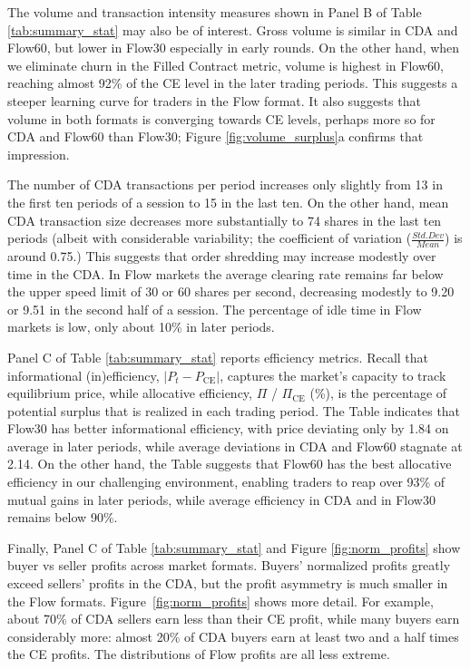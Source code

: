 \documentclass[12pt]{article}
\begin{document}
The volume and transaction intensity measures shown in Panel B of Table \ref{tab:summary_stat} may also be of interest.
Gross volume is similar in CDA and Flow60, but lower in Flow30
especially in early rounds.
On the other hand, when we eliminate churn in the Filled Contract metric, volume is highest in Flow60, reaching almost 92\% of the CE level in the later trading periods.  
This suggests a steeper learning curve for traders in the Flow format. 
It also suggests that volume in both formats is converging towards CE levels, perhaps more so for CDA and Flow60 than Flow30; 
Figure \ref{fig:volume_surplus}a
confirms that impression.


The number of CDA transactions per period increases only slightly from 13 in the first ten periods of a session to 15 in the last ten. On the other hand, mean CDA transaction size decreases more substantially to 74 shares in the last ten periods (albeit with considerable variability; the coefficient of variation ($\frac{Std. Dev}{Mean}$) is around 0.75.) 
This suggests that order shredding may increase modestly
over time in the CDA.
In Flow markets the average clearing rate remains far below the upper speed limit of 30 or 60 shares per second, decreasing modestly to 9.20 or 9.51 in the second half of a session. 
The percentage of idle time in Flow markets %
is low, only about 10\% in later periods. 

Panel C of Table \ref{tab:summary_stat} reports efficiency metrics. Recall that informational (in)efficiency, $\lvert P_t - P_{\text{CE}} \rvert $, captures the market's capacity to track equilibrium price, while allocative efficiency,  $\Pi$ / $\Pi_{\text{CE}}$ (\%), is the percentage of potential surplus that is realized in each trading period. The Table indicates that Flow30 has better informational efficiency, with price deviating only by 1.84 on average in later periods,
while average deviations in CDA and Flow60 stagnate at 2.14.
On the other hand, the Table suggests that Flow60 has the best allocative efficiency in our challenging environment, enabling traders to reap over 93\% of mutual gains in later periods, while average efficiency 
in CDA and in Flow30 remains below 90\%. 

Finally, Panel C of Table \ref{tab:summary_stat} and Figure \ref{fig:norm_profits} show buyer vs seller  profits across market formats. Buyers' normalized profits greatly exceed sellers' profits in the CDA, but the profit asymmetry is much smaller in the Flow formats. 
Figure~\ref{fig:norm_profits} shows more detail. 
For example, about 70\% of CDA sellers earn less than their CE profit, while many buyers earn considerably more:
almost 20\% of CDA buyers earn at least two and a half times the CE profits.
The distributions of Flow profits are all less extreme.
\end{document}
